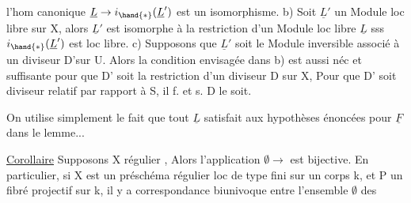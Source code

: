 l'hom canonique $\underline{L} \to i_{\hand{*}}(\underline{L}')$ est un isomorphisme.  \hand{(} b) Soit $\underline{L}'$ un
Module loc libre sur X, alors $\underline{L}'$ est isomorphe à la restriction d'un
Module loc libre $\underline{L}$ sss $i_{\hand{*}}(\underline{L}')$ est loc libre. c) Supposons que $\underline{L}'$ soit
le Module inversible associé à un diviseur  D'\hand{/}sur U. Alors
la condition envisagée dans b) est aussi néc et suffisante pour que D'
soit la restriction d'un diviseur  D sur X,  \hand{|} Pour que D' soit
diviseur  relatif par rapport à S, il f. et s.  D le soit.

On utilise simplement le fait que tout $\underline{L}$ satisfait aux 
hypothèses énoncées pour $\underline{F}$ dans le lemme...

\uline{Corollaire}  Supposons  X régulier\hand{)} , Alors l'application $\emptyset \to$  est bijective. En particulier, si X est
un préschéma régulier loc de type fini sur un corps k, et P un fibré
projectif sur k, il y a correspondance biunivoque entre l'ensemble $\emptyset$ des

